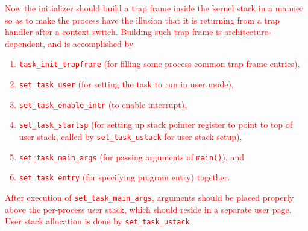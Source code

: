 \documentclass{report}
\begin{document}
	\textcolor{red}{
		Now the initializer should build a trap frame inside the kernel stack in a
		manner so as to make the process have the illusion that it is returning from
		a trap handler after a context switch.  Building such trap frame is
		architecture-dependent, and is accomplished by
		\begin{enumerate}
			\item \texttt{task\_init\_trapframe}
			 (for filling some process-common trap frame entries),
			\item \texttt{set\_task\_user}
			 (for setting the task to run in user mode),
			\item \texttt{set\_task\_enable\_intr}
			 (to enable interrupt),
			\item \texttt{set\_task\_startsp}
			 (for setting up stack pointer register to point to top of user stack,
			called by \texttt{set\_task\_ustack}
			for user stack setup),
			\item \texttt{set\_task\_main\_args}
			 (for passing arguments of \texttt{main()}), and
			\item \texttt{set\_task\_entry}
			 (for specifying program entry) together.
		\end{enumerate}
		After execution of \texttt{set\_task\_main\_args},
		arguments should be placed properly above the per-process user stack, which should reside in
		a separate user page.  User stack allocation is done by \texttt{set\_task\_ustack}
		\marginpar{
			\footnotesize\ttfamily
			\textcolor{red}{kern/sched/task.c:71}
		}
	}
	
\end{document}
